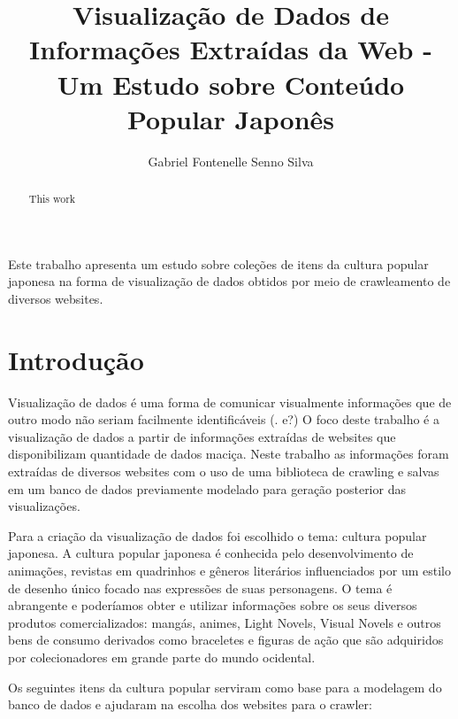 \documentclass[12pt]{article}
\title{Visualização de Dados de Informações Extraídas da Web - Um Estudo sobre Conteúdo Popular Japonês}
\author{Gabriel Fontenelle Senno Silva\inst{1}}
\begin{document}
 
\maketitle

\begin{abstract}

This work 
\end{abstract}
     
\begin{resumo} 


Este trabalho apresenta um estudo sobre coleções de itens da cultura popular japonesa na forma de visualização de dados obtidos por meio de crawleamento de diversos websites.

\end{resumo}


\section{Introdução}

Visualização de dados é uma forma de comunicar visualmente informações que de outro modo não seriam facilmente identificáveis (. e?) O foco deste trabalho é a visualização de dados a partir de informações extraídas de websites que disponibilizam quantidade de dados maciça. Neste trabalho as informações foram extraídas de diversos websites com o uso de uma biblioteca de crawling e salvas em um banco de dados previamente modelado para geração posterior das visualizações.

Para a criação da visualização de dados foi escolhido o tema: cultura popular japonesa. A cultura popular japonesa é conhecida pelo desenvolvimento de animações, revistas em quadrinhos e gêneros literários influenciados por um estilo de desenho único focado nas expressões de suas personagens. O tema é abrangente e poderíamos obter e utilizar informações sobre os seus diversos produtos comercializados: mangás, animes, Light Novels, Visual Novels e outros bens de consumo derivados como braceletes e figuras de ação que são adquiridos por colecionadores em grande parte do mundo ocidental.


Os seguintes itens da cultura popular serviram como base para a modelagem do banco de dados e ajudaram na escolha dos websites para o crawler:
\end{document}
